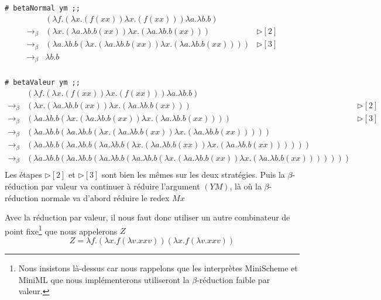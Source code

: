 \documentclass[11pt]{book}
\begin{document}
\verb+# betaNormal ym ;;+
$$
\begin{array}{lll}
 & (\lambda f . (\lambda x . (f(xx))\lambda x . (f(xx)))\lambda a . \lambda b . b) &  \\
 \rightarrow _\beta & (\lambda x . (\lambda a . \lambda b . b(xx))\lambda x . (\lambda a . \lambda b . b(xx))) &\triangleright [2]  \\
 \rightarrow _\beta & (\lambda a . \lambda b . b(\lambda x . (\lambda a . \lambda b . b(xx))\lambda x . (\lambda a . \lambda b . b(xx))))  &\triangleright [3]  \\
 \rightarrow _\beta & \lambda b . b &  \\
\end{array}
$$

\verb+# betaValeur ym ;;+
$$
\begin{array}{lll}
 & (\lambda f . (\lambda x . (f(xx))\lambda x . (f(xx)))\lambda a . \lambda b . b)  &  \\
\rightarrow _\beta & (\lambda x . (\lambda a . \lambda b . b(xx))\lambda x . (\lambda a . \lambda b . b(xx))) & \triangleright [2]  \\
\rightarrow _\beta & (\lambda a . \lambda b . b(\lambda x . (\lambda a . \lambda b . b(xx))\lambda x . (\lambda a . \lambda b . b(xx)))) & \triangleright [3] \\
\rightarrow _\beta & (\lambda a . \lambda b . b(\lambda a . \lambda b . b(\lambda x . (\lambda a . \lambda b . b(xx))\lambda x . (\lambda a . \lambda b . b(xx)))))  & \\
\rightarrow _\beta & (\lambda a . \lambda b . b(\lambda a . \lambda b . b(\lambda a . \lambda b . b(\lambda x . (\lambda a . \lambda b . b(xx))\lambda x . (\lambda a . \lambda b . b(xx)))))) &  \\
\rightarrow _\beta & (\lambda a . \lambda b . b(\lambda a . \lambda b . b(\lambda a . \lambda b . b(\lambda a . \lambda b . b(\lambda x . (\lambda a . \lambda b . b(xx))\lambda x . (\lambda a . \lambda b . b(xx)))))))  & \\
\end{array}
$$
Les étapes  $\triangleright [2]$ et $\triangleright [3]$ sont bien les mêmes sur les deux stratégies. 
Puis la $\beta$-réduction par valeur va continuer à réduire l'argument
$(YM)$, là où la $\beta$-réduction normale va d'abord réduire le redex $Mx$

Avec la réduction par valeur, il nous faut donc utiliser un autre combinateur de point fixe\footnote{Nous insistons 
là-dessus car nous rappelons que les interprètes MiniScheme et MiniML que nous implémenterons utiliseront la $\beta$-réduction faible par valeur.}
 que nous appelerons $Z$ 
$$Z = \lambda f.(\lambda x.f(\lambda v.xxv))(\lambda x.f(\lambda v.xxv)) $$
\end{document}
